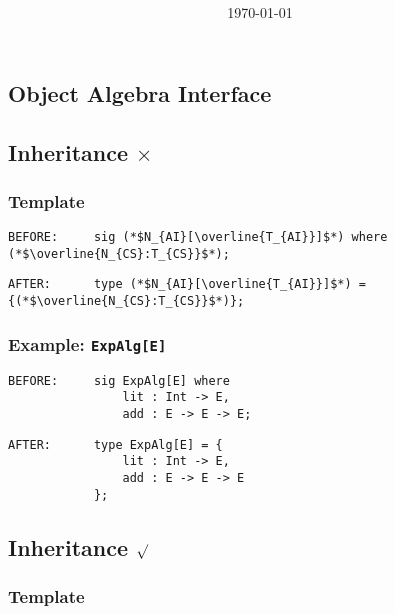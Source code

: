 \documentclass{article}
\title{\huge\textmd{\bf\thistitle}}
\date{}
\author{\today}
\begin{document}
\begin{spacing}{1.1}
\maketitle \thispagestyle{empty}


\section{Object Algebra Interface}

\subsection{Inheritance $\times$}

\subsubsection{Template}

\begin{lstlisting}[numbers=none]
BEFORE:     sig (*$N_{AI}[\overline{T_{AI}}]$*) where (*$\overline{N_{CS}:T_{CS}}$*);
\end{lstlisting}
\begin{lstlisting}[numbers=none]
AFTER:      type (*$N_{AI}[\overline{T_{AI}}]$*) = {(*$\overline{N_{CS}:T_{CS}}$*)};
\end{lstlisting}

\subsubsection{Example: \lstinline{ExpAlg[E]}}

\begin{lstlisting}[numbers=none]
BEFORE:     sig ExpAlg[E] where
                lit : Int -> E,
                add : E -> E -> E;
\end{lstlisting}
\begin{lstlisting}[numbers=none]
AFTER:      type ExpAlg[E] = {
                lit : Int -> E,
                add : E -> E -> E
            };
\end{lstlisting}

\subsection{Inheritance $\surd$}

\subsubsection{Template}


\end{spacing}
\end{document}
